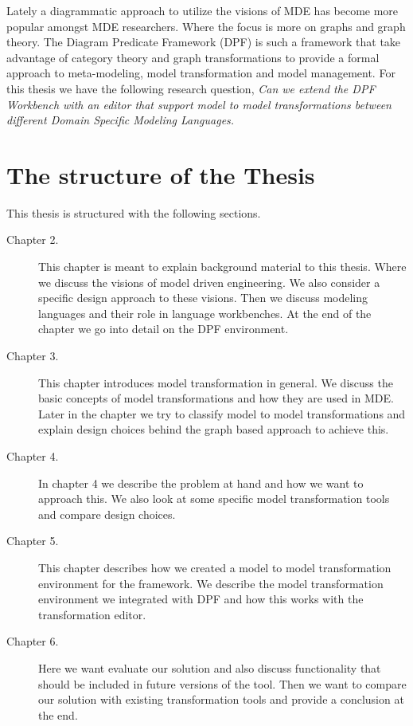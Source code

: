 Lately a diagrammatic approach to utilize the visions of MDE has become more
popular amongst MDE researchers. Where the focus is more on graphs and graph
theory. The Diagram Predicate Framework (DPF) is such a framework that take
advantage of category theory and graph transformations to provide a formal
approach to meta-modeling, model transformation and model management. For this
thesis we have the following research question, \textit{Can we extend the DPF
Workbench with an editor that support model to model transformations between
different Domain Specific Modeling Languages.}

\section{The structure of the Thesis}

This thesis is structured with the following sections.

\begin{description}
  \item[Chapter 2.] This chapter is meant to explain background material to this
  thesis. Where we discuss the visions of model driven engineering. We also
  consider a specific design approach to these visions. Then we discuss modeling
  languages and their role in language workbenches. At the end of the chapter we
  go into detail on the DPF environment. 
  
  \item[Chapter 3.] This chapter introduces model transformation in general. We
  discuss the basic concepts of model transformations and how they are used in
  MDE. Later in the chapter we try to classify model to model transformations
  and explain design choices behind the graph based approach to achieve this.
  
  
  \item[Chapter 4.] In chapter 4 we describe the problem at hand and how we want
  to approach this. We also look at some specific model transformation tools and
  compare design choices. 
  
  
  \item[Chapter 5.] This chapter describes how we created a model
  to model transformation environment for the framework. We describe the model
  transformation environment we integrated with DPF and how this works with the
  transformation editor. 
  
  
  \item[Chapter 6.] Here we want evaluate our solution and also discuss
  functionality that should be included in future versions of the tool. Then we
  want to compare our solution with existing transformation tools and provide a
  conclusion at the end. 
\end{description}